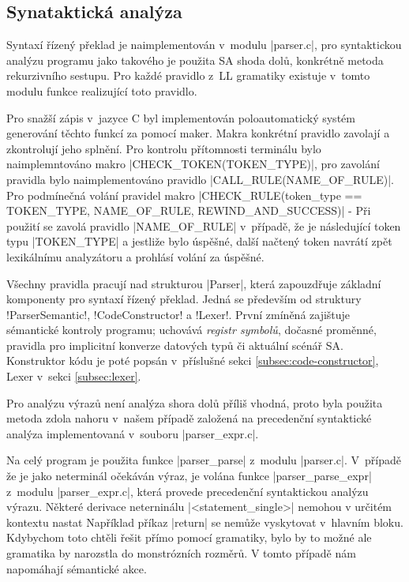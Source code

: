 \subsection{Synataktická analýza}
Syntaxí řízený překlad je naimplementován v~modulu \ic|parser.c|, pro syntaktickou analýzu programu jako takového je
použita SA shoda dolů, konkrétně metoda rekurzivního sestupu. Pro každé pravidlo z~LL gramatiky existuje v~tomto
modulu funkce realizující toto pravidlo.

Pro snažší zápis v~jazyce C byl implementován poloautomatický systém generování těchto funkcí za pomocí maker.
Makra konkrétní pravidlo zavolají a zkontrolují jeho splnění. Pro kontrolu přítomnosti terminálu bylo
naimplemntováno makro \ic|CHECK_TOKEN(TOKEN_TYPE)|, pro zavolání pravidla bylo naimplementováno pravidlo
\ic|CALL_RULE(NAME_OF_RULE)|. Pro podmínečná volání pravidel makro
\ic|CHECK_RULE(token_type == TOKEN_TYPE, NAME_OF_RULE, REWIND_AND_SUCCESS)| - Při použití se zavolá pravidlo
\ic|NAME_OF_RULE| v~případě, že je následující token typu \ic|TOKEN_TYPE| a jestliže bylo úspěšné, další načtený
token navrátí zpět lexikálnímu analyzátoru a prohlásí volání za úspěšné.

Všechny pravidla pracují nad strukturou \ic|Parser|, která zapouzdřuje základní komponenty pro syntaxí řízený překlad.
Jedná se především od struktury \ic!ParserSemantic!, \ic!CodeConstructor! a \ic!Lexer!. První zmíněná zajištuje sémantické
kontroly programu; uchovává \emph{registr symbolů}, dočasné proměnné, pravidla pro implicitní konverze datových typů či
aktuální scénář SA. Konstruktor kódu je poté popsán v~příslušné sekci \ref{subsec:code-constructor}, Lexer v~sekci
\ref{subsec:lexer}.

Pro analýzu výrazů není analýza shora dolů příliš vhodná, proto byla
použita metoda zdola nahoru v~našem případě založená na precedenční
syntaktické analýza implementovaná v~souboru \ic|parser_expr.c|.

Na celý program je použita funkce \ic|parser_parse| z~modulu \ic|parser.c|. V~případě že je jako neterminál
očekáván výraz, je volána funkce \ic|parser_parse_expr| z~modulu \ic|parser_expr.c|, která provede precedenční
syntaktickou analýzu výrazu. Některé derivace neterninálu \ic|<statement_single>| nemohou v určitém kontextu nastat
Například příkaz \ic|return| se nemůže vyskytovat v~hlavním bloku. Kdybychom toto chtěli řešit
přímo pomocí gramatiky, bylo by to možné ale gramatika by narozstla do monstrózních rozměrů.
V tomto případě nám napomáhají sémantické akce.

